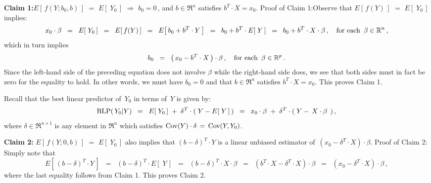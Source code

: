 \vskip 0.3cm
\noindent
\textbf{Claim 1:}\quad $E\!\left[\,f(Y;b_{0},b)\,\right]$ $=$ $E\!\left[\;Y_{0}\,\right]$
\;\;$\Longrightarrow$\;\; $b_{0} = 0$\,, \;and\; $b \in \Re^{n}$ satisfies $b^{T}\cdot X = x_{0}$.
\mbox{}\vskip 0.2cm\noindent
Proof of Claim 1:\quad Observe that $E\!\left[\,f(Y)\,\right]$ $=$ $E\!\left[\;Y_{0}\,\right]$ implies:
\begin{equation*}
x_{0} \cdot \beta
\;\; = \;\;
	E\!\left[\;Y_{0}\,\right]
\;\; = \;\;
	E\!\left[\,f(Y)\,\right]
\;\; = \;\;
	E\!\left[\,b_{0} + b^{T}\cdot Y\,\right]
\;\; = \;\;
	b_{0} + b^{T}\cdot E\!\left[\;Y\,\right]
\;\; = \;\;
	b_{0} + b^{T}\cdot X \cdot \beta\,,
	\quad
	\textnormal{for each \,$\beta\in\Re^{n}$}\,,
\end{equation*}
which in turn implies
\begin{equation*}
b_{0}
\;\; = \;\;
	\left(\,x_{0} - b^{T}\cdot X\,\right) \cdot \beta\,,
	\quad
	\textnormal{for each \,$\beta\in\Re^{p}$}\,.
\end{equation*}
Since the left-hand side of the preceding equation does not involve $\beta$
while the right-hand side does, we see that both sides must in fact be zero for the equality to hold.
In other words, we must have $b_{0} = 0$ and that $b \in \Re^{n}$ satisfies $b^{T} \cdot X = x_{0}$.
This proves Claim 1.

\vskip 0.5cm
\noindent
Recall that the best linear predictor of \,$Y_{0}$ in terms of \,$Y$ is given by:
\begin{equation*}
\blp(\,Y_{0}\vert Y)
\;\; = \;\;
	E\!\left[\;Y_{0}\,\right] \; + \; \delta^{T}\cdot(\;Y - E\!\left[\;Y\,\right]\,)
\;\; = \;\;
	x_{0}\cdot\beta \; + \; \delta^{T}\cdot(\;Y - \,X\cdot\beta\,\;)\,,
\end{equation*}
where $\delta \in \Re^{n \times 1}$ is any element in $\Re^{n}$ which satisfies
$\Cov(Y) \cdot \delta \,=\, \Cov(Y,Y_{0})$.

\vskip 0.5cm
\noindent
\textbf{Claim 2:}\quad
$E\!\left[\,f(Y;0,b)\,\right]$ $=$ $E\!\left[\;Y_{0}\,\right]$
also implies that
$(b - \delta)^{T}\cdot Y$ is a linear unbiased estimator of \,$(x_{0} - \delta^{T}\cdot X)\cdot\beta$.
\vskip 0.2cm
\noindent
Proof of Claim 2:\quad
Simply note that
\begin{equation*}
E\!\left[\,(b - \delta)^{T}\cdot Y\,\right]
\;\; = \;\;
	(b - \delta)^{T} \cdot E\!\left[\;Y\,\right]
\;\; = \;\;
	(b - \delta)^{T} \cdot X \cdot \beta
\;\; = \;\;
	(b^{T}\cdot X - \delta^{T} \cdot X) \cdot \beta
\;\; = \;\;
	(x_{0} - \delta^{T} \cdot X) \cdot \beta\,,
\end{equation*}
where the last equality follows from Claim 1.
This proves Claim 2.

